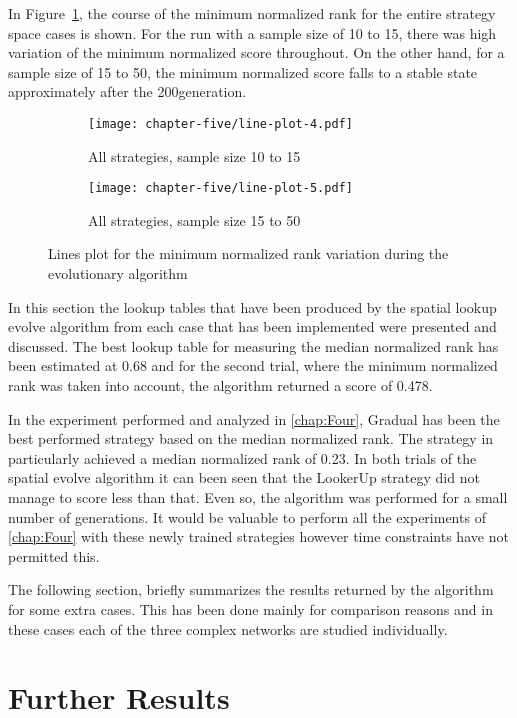 In Figure~\ref{fig:line-plot-min}, the course of the minimum normalized rank
for the entire strategy space cases is shown. For the run with a sample size of 10 to 15, there was
high variation of the minimum normalized score throughout. On the other hand, for a sample
size of 15 to 50, the minimum normalized score falls to a stable state approximately
after the 200\nth generation.

\begin{figure}[H]
	\centering
	\begin{subfigure}[H]{0.45\textwidth}
		\centering
		\texttt{[image: chapter-five/line-plot-4.pdf]}
		\caption{All strategies, sample size 10 to 15}
	\end{subfigure}
  \hfill
  \begin{subfigure}[H]{0.45\textwidth}
    \centering
    \texttt{[image: chapter-five/line-plot-5.pdf]}
    \caption{All strategies, sample size 15 to 50}
  \end{subfigure}
	\caption{Lines plot for the minimum normalized rank variation during the
          evolutionary algorithm}
	\label{fig:line-plot-min}
\end{figure}

In this section the lookup tables that have been produced by the spatial lookup
evolve algorithm from each case that has been implemented were presented and discussed.
The best lookup table for measuring the median normalized rank has been estimated
at 0.68 and for the second trial, where the minimum normalized rank was taken into
account, the algorithm returned a score of 0.478.

In the experiment performed and analyzed in \autoref{chap:Four}, Gradual has been
the best performed strategy based on the median normalized rank. The strategy in
particularly achieved a median normalized rank of 0.23. In both trials of the
spatial evolve algorithm it can been seen that the LookerUp strategy did not
manage to score less than that. Even so, the algorithm was performed for a small
number of generations. It would be valuable to perform all the experiments of
\autoref{chap:Four} with these newly trained strategies however time constraints have not
permitted this.

The following section, briefly summarizes the results returned by the algorithm
for some extra cases. This has been done mainly for comparison reasons
and in these cases each of the three complex networks are studied individually.

\section{Further Results}

